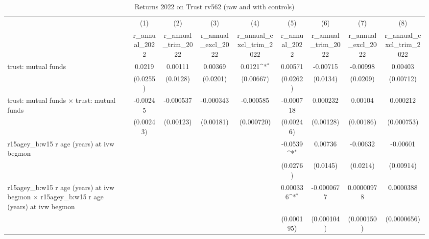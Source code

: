 \begin{table}[htbp]\centering
\def\sym#1{\ifmmode^{#1}\else\(^{#1}\)\fi}
\caption{Returns 2022 on Trust rv562 (raw and with controls)}
\begin{tabular}{l*{8}{c}}
\toprule
                &\multicolumn{1}{c}{(1)}&\multicolumn{1}{c}{(2)}&\multicolumn{1}{c}{(3)}&\multicolumn{1}{c}{(4)}&\multicolumn{1}{c}{(5)}&\multicolumn{1}{c}{(6)}&\multicolumn{1}{c}{(7)}&\multicolumn{1}{c}{(8)}\\
                &\multicolumn{1}{c}{r\_annual\_2022}&\multicolumn{1}{c}{r\_annual\_trim\_2022}&\multicolumn{1}{c}{r\_annual\_excl\_2022}&\multicolumn{1}{c}{r\_annual\_excl\_trim\_2022}&\multicolumn{1}{c}{r\_annual\_2022}&\multicolumn{1}{c}{r\_annual\_trim\_2022}&\multicolumn{1}{c}{r\_annual\_excl\_2022}&\multicolumn{1}{c}{r\_annual\_excl\_trim\_2022}\\
\midrule
trust: mutual funds&   0.0219         &  0.00111         &  0.00369         &   0.0121\sym{*}  &  0.00571         & -0.00715         & -0.00998         &  0.00403         \\
                & (0.0255)         & (0.0128)         & (0.0201)         &(0.00667)         & (0.0262)         & (0.0134)         & (0.0209)         &(0.00712)         \\
\addlinespace
trust: mutual funds $\times$ trust: mutual funds& -0.00245         &-0.000537         &-0.000343         &-0.000585         &-0.000718         & 0.000232         &  0.00104         & 0.000212         \\
                &(0.00243)         &(0.00123)         &(0.00181)         &(0.000720)         &(0.00246)         &(0.00128)         &(0.00186)         &(0.000753)         \\
\addlinespace
r15agey\_b:w15 r age (years) at ivw begmon&                  &                  &                  &                  &  -0.0539\sym{*}  &  0.00736         & -0.00632         & -0.00601         \\
                &                  &                  &                  &                  & (0.0276)         & (0.0145)         & (0.0214)         &(0.00914)         \\
\addlinespace
r15agey\_b:w15 r age (years) at ivw begmon $\times$ r15agey\_b:w15 r age (years) at ivw begmon&                  &                  &                  &                  & 0.000336\sym{*}  &-0.0000677         &0.00000978         &0.0000388         \\
                &                  &                  &                  &                  &(0.000195)         &(0.000104)         &(0.000150)         &(0.0000656)         \\

\end{tabular}
\end{table}
